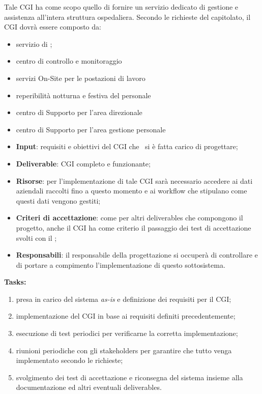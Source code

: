 		Tale CGI ha come scopo quello di fornire un servizio dedicato di gestione e assistenza all'intera struttura ospedaliera.
		Secondo le richieste del capitolato, il CGI dovrà essere composto da:
		\begin{itemize}[noitemsep]
			\renewcommand\labelitemi{--}
			\item servizio di \helpdesk;
			\item centro di controllo e monitoraggio
			\item servizi On-Site per le postazioni di lavoro
			\item reperibilità notturna e festiva del personale
			\item centro di Supporto per l'area direzionale
			\item centro di Supporto per l'area gestione personale
		\end{itemize}
	
		\begin{itemize}[noitemsep]
			\renewcommand\labelitemi{--}
			\item \textbf{Input}: requisiti e obiettivi del CGI che \azienda~si è fatta carico di progettare;
			\item \textbf{Deliverable}: CGI completo e funzionante;
			\item \textbf{Risorse}: per l'implementazione di tale CGI sarà necessario accedere ai dati aziendali raccolti fino a questo momento e ai workflow che stipulano come questi dati vengono gestiti;
			\item \textbf{Criteri di accettazione}: come per altri deliverables che compongono il progetto, anche il CGI ha come criterio il passaggio dei test di accettazione svolti con il \proponente;
			\item \textbf{Responsabili}: il responsabile della progettazione si occuperà di controllare e di portare a compimento l'implementazione di questo sottosistema.
		\end{itemize}
		
		\textbf{Tasks:}
		\begin{enumerate}[noitemsep]
			\item presa in carico del sistema \textit{as-is} e definizione dei requisiti per il CGI;
			\item implementazione del CGI in base ai requisiti definiti precedentemente;
			\item esecuzione di test periodici per verificarne la corretta implementazione;
			\item riunioni periodiche con gli stakeholders per garantire che tutto venga implementato secondo le richieste;
			\item svolgimento dei test di accettazione e riconsegna del sistema insieme alla documentazione ed altri eventuali deliverables.
		\end{enumerate}
	
